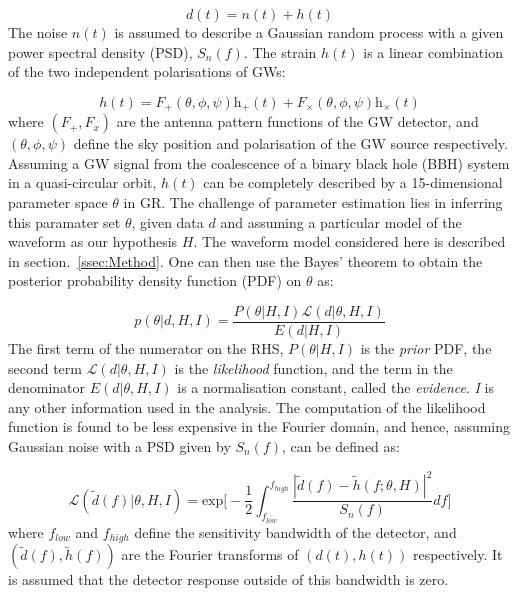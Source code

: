 \documentclass[prd,preprintnumbers,twocolumn,eqsecnum,floatfix,a4paper,nofootinbib,superscriptaddress]{revtex4}
\begin{document}
\begin{equation}
d(t) = n(t) + h(t)
\label{eq:detector_strain}
\end{equation}
The noise $n(t)$ is assumed to describe a Gaussian random process with a given power spectral density (PSD), $S_n(f)$. The strain $h(t)$ is a linear combination of the two independent polarisations of GWs:

\begin{equation}
h(t) = F_+(\theta, \phi, \psi)\mathrm{h}_+(t) + F_{\times}(\theta, \phi, \psi)\mathrm{h}_{\times}(t)
\end{equation}
where $(F_+, F_x)$ are the antenna pattern functions of the GW detector, and $(\theta, \phi, \psi)$ define the sky position and polarisation of the GW source respectively. Assuming a GW signal from the coalescence of a binary black hole (BBH) system in a quasi-circular orbit, $h(t)$ can be completely described by a 15-dimensional parameter space $\theta$ in GR. The challenge of parameter estimation lies in inferring this paramater set $\theta$, given data $d$ and assuming a particular model of the waveform as our hypothesis $H$. The waveform model considered here is described in section.~\ref{ssec:Method}. One can then use the Bayes' theorem to obtain the posterior probability density function (PDF) on $\theta$ as:

\begin{equation}
p(\theta|d, H, I) = \frac{P(\theta|H, I) \mathcal{L}(d|\theta, H, I)}{E(d|H, I)}
\label{eq:Bayes_theorem}
\end{equation} 
The first term of the numerator on the RHS, $P(\theta|H,I)$ is the \emph{prior} PDF, the second term $\mathcal{L}(d|\theta, H,I)$ is the \emph{likelihood} function, and the term in the denominator $E(d|\theta, H,I)$ is a normalisation constant, called the \emph{evidence}. \emph{I} is any other information used in the analysis. The computation of the likelihood function is found to be less expensive in the Fourier domain, and hence, assuming Gaussian noise with a PSD given by $S_n(f)$, can be defined as:

\begin{equation}
\mathcal{L}(\tilde{d}(f)|\theta, H,I) = \text{exp}\Big[ -\frac{1}{2}\int_{f_{low}}^{f_{high}} \frac{|\tilde{d}(f) - \tilde{h}(f;\theta, H)|^2}{S_n(f)}df\Big]
\end{equation}
where $f_{low}$ and $f_{high}$ define the sensitivity bandwidth of the detector, and $(\tilde{d}(f), \tilde{h}(f))$ are the Fourier transforms of $(d(t), h(t))$ respectively. It is assumed that the detector response outside of this bandwidth is zero. 
\end{document}
